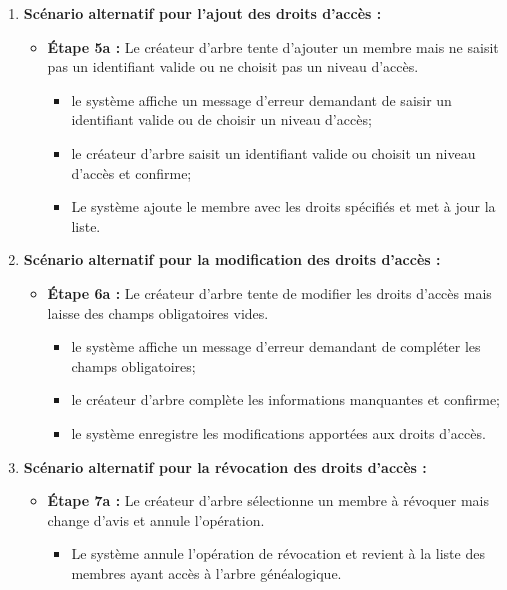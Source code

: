 \begin{enumerate}
    \item \textbf{Scénario alternatif pour l'ajout des droits d'accès :}
    \begin{itemize}
        \item \textbf{Étape 5a :} Le créateur d'arbre tente d'ajouter un membre
          mais ne saisit pas un identifiant valide ou ne choisit pas un niveau d'accès.
        \begin{itemize}
            \item le système affiche un message d'erreur demandant de saisir un
              identifiant valide ou de choisir un niveau d'accès;
            \item le créateur d'arbre saisit un identifiant valide ou choisit un niveau d'accès et confirme;
            \item Le système ajoute le membre avec les droits spécifiés et met à jour la liste.
        \end{itemize}
    \end{itemize}

    \item \textbf{Scénario alternatif pour la modification des droits d'accès :}
    \begin{itemize}
        \item \textbf{Étape 6a :} Le créateur d'arbre tente de modifier les droits
          d'accès mais laisse des champs obligatoires vides.
        \begin{itemize}
            \item le système affiche un message d'erreur demandant de compléter les champs obligatoires;
            \item le créateur d'arbre complète les informations manquantes et confirme;
            \item le système enregistre les modifications apportées aux droits d'accès.
        \end{itemize}
    \end{itemize}

    \item \textbf{Scénario alternatif pour la révocation des droits d'accès :}
    \begin{itemize}
        \item \textbf{Étape 7a :} Le créateur d'arbre sélectionne un membre à
          révoquer mais change d'avis et annule l'opération.
        \begin{itemize}
            \item Le système annule l'opération de révocation et revient à la
              liste des membres ayant accès à l'arbre généalogique.
        \end{itemize}
    \end{itemize}

\end{enumerate}


